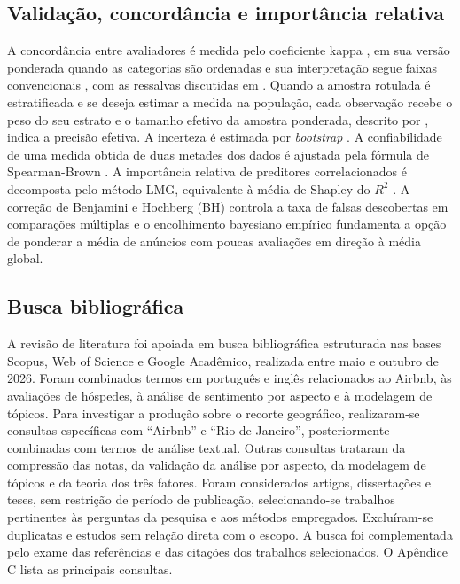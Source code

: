 \subsection{Validação, concordância e importância relativa}

A concordância entre avaliadores é medida pelo coeficiente kappa \citep{cohen1960}, em sua versão ponderada quando as categorias são ordenadas \citep{cohen1968} e sua interpretação segue faixas convencionais \citep{landis1977}, com as ressalvas discutidas em \citet{mchugh2012}. Quando a amostra rotulada é estratificada e se deseja estimar a medida na população, cada observação recebe o peso do seu estrato e o tamanho efetivo da amostra ponderada, descrito por \citet{kish1992}, indica a precisão efetiva. A incerteza é estimada por \textit{bootstrap} \citep{efron1979}. A confiabilidade de uma medida obtida de duas metades dos dados é ajustada pela fórmula de Spearman-Brown \citep{brown1910,spearman1910}. A importância relativa de preditores correlacionados é decomposta pelo método LMG, equivalente à média de Shapley do $R^2$ \citep{lindeman1980,gromping2006,gromping2007}. A correção de Benjamini e Hochberg (BH) \citep{benjamini1995} controla a taxa de falsas descobertas em comparações múltiplas e o encolhimento bayesiano empírico \citep{efron1975} fundamenta a opção de ponderar a média de anúncios com poucas avaliações em direção à média global.

\subsection{Busca bibliográfica}

A revisão de literatura foi apoiada em busca bibliográfica estruturada nas bases Scopus, Web of Science e Google Acadêmico, realizada entre maio e outubro de 2026. Foram combinados termos em português e inglês relacionados ao Airbnb, às avaliações de hóspedes, à análise de sentimento por aspecto e à modelagem de tópicos. Para investigar a produção sobre o recorte geográfico, realizaram-se consultas específicas com “Airbnb” e “Rio de Janeiro”, posteriormente combinadas com termos de análise textual. Outras consultas trataram da compressão das notas, da validação da análise por aspecto, da modelagem de tópicos e da teoria dos três fatores. Foram considerados artigos, dissertações e teses, sem restrição de período de publicação, selecionando-se trabalhos pertinentes às perguntas da pesquisa e aos métodos empregados. Excluíram-se duplicatas e estudos sem relação direta com o escopo. A busca foi complementada pelo exame das referências e das citações dos trabalhos selecionados. O Apêndice C lista as principais consultas.

